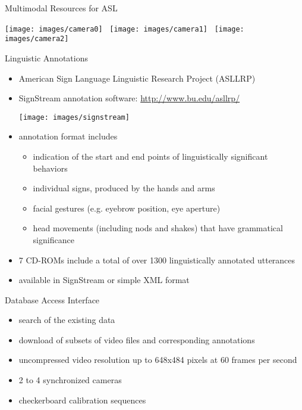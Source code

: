 \documentclass[final]{beamer}
\newcommand*{\signstream}{SignStream\texttrademark\xspace}
\begin{document}
\begin{frame}{}
\begin{columns}[t]
\begin{column}{.45\linewidth}
\begin{block}{Multimodal Resources for ASL}
      \begin{center}
        \texttt{[image: images/camera0]}
        \,
        \texttt{[image: images/camera1]}
        \,
        \texttt{[image: images/camera2]}
      \end{center}
    \end{block}

    \begin{block}{Linguistic Annotations}
      \begin{itemize}
      \item American Sign Language Linguistic Research Project (ASLLRP)
      \item \signstream annotation software: \url{http://www.bu.edu/asllrp/}
        
        \centerline{\texttt{[image: images/signstream]}}

      \item annotation format includes
        \begin{itemize}
        \item indication of the start and end points of linguistically significant behaviors
        \item individual signs, produced by the hands and arms
        \item facial gestures (e.g. eyebrow position, eye aperture)
        \item head movements (including nods and shakes) that have grammatical significance
        \end{itemize}
        
      \item 7 CD-ROMs include a total of \alert{over 1300} linguistically annotated utterances
      \item available in \signstream or simple XML format
      \end{itemize}
    \end{block}
    
    \begin{block}{Database Access Interface}
      \begin{itemize}
      \item search of the existing data
      \item download of subsets of video files and corresponding annotations
      \item uncompressed video resolution up to 648x484 pixels at 60 frames per second
      \item 2 to 4 synchronized cameras
      \item checkerboard calibration sequences
      \end{itemize}
      

\end{block}
\end{column}
\end{columns}
\end{frame}
\end{document}
